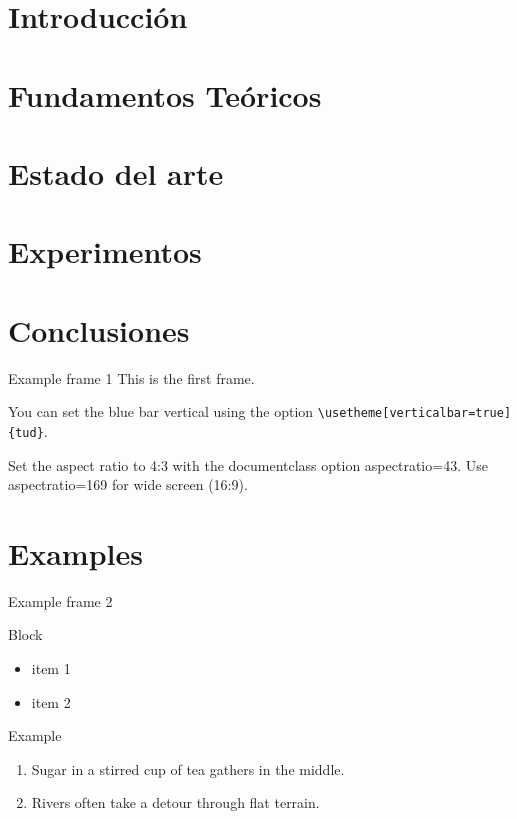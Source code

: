 \documentclass[aspectratio=43]{beamer}
\renewcommand{\cite}[1]{\footnote<.->[frame]{\fullcite{#1}}}
\begin{document}

\section{Introducción}

\section{Fundamentos Teóricos}

\section{Estado del arte}

\section{Experimentos}

\section{Conclusiones}


\begin{frame}[fragile]{Example frame 1} %
This is the first frame.

You can set the blue bar vertical using the option \verb|\usetheme[verticalbar=true]{tud}|.

Set the aspect ratio to 4:3 with the
documentclass option aspectratio=43. Use aspectratio=169 for wide screen (16:9).
\end{frame}

\section{Examples}
\begin{frame}{Example frame 2}
  \begin{block}{Block}
    \begin{itemize}
      \item item 1
      \item item 2
    \end{itemize}
  \end{block}

  \begin{exampleblock}{Example}
    \begin{enumerate}
      \item Sugar in a stirred cup of tea gathers in the middle.
      \item Rivers often take a detour through flat terrain.
    \end{enumerate}
  \end{exampleblock}

\end{frame}
\end{document}
